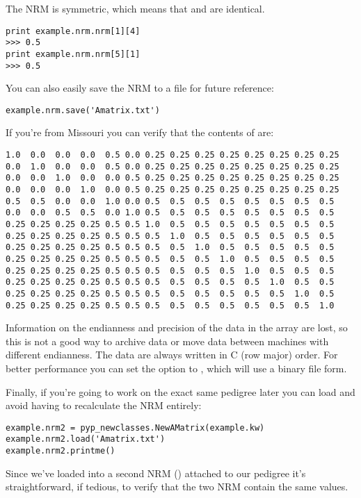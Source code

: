 The NRM is symmetric, which means that  and  are identical.
\begin{verbatim}
print example.nrm.nrm[1][4]
>>> 0.5
print example.nrm.nrm[5][1]
>>> 0.5
\end{verbatim}
You can also easily save the NRM to a file for future reference:
\begin{verbatim}
example.nrm.save('Amatrix.txt')
\end{verbatim}
If you're from Missouri you can verify that the contents of  are:
\begin{verbatim}
1.0  0.0  0.0  0.0  0.5 0.0 0.25 0.25 0.25 0.25 0.25 0.25 0.25 0.25
0.0  1.0  0.0  0.0  0.5 0.0 0.25 0.25 0.25 0.25 0.25 0.25 0.25 0.25
0.0  0.0  1.0  0.0  0.0 0.5 0.25 0.25 0.25 0.25 0.25 0.25 0.25 0.25
0.0  0.0  0.0  1.0  0.0 0.5 0.25 0.25 0.25 0.25 0.25 0.25 0.25 0.25
0.5  0.5  0.0  0.0  1.0 0.0 0.5  0.5  0.5  0.5  0.5  0.5  0.5  0.5
0.0  0.0  0.5  0.5  0.0 1.0 0.5  0.5  0.5  0.5  0.5  0.5  0.5  0.5
0.25 0.25 0.25 0.25 0.5 0.5 1.0  0.5  0.5  0.5  0.5  0.5  0.5  0.5
0.25 0.25 0.25 0.25 0.5 0.5 0.5  1.0  0.5  0.5  0.5  0.5  0.5  0.5
0.25 0.25 0.25 0.25 0.5 0.5 0.5  0.5  1.0  0.5  0.5  0.5  0.5  0.5
0.25 0.25 0.25 0.25 0.5 0.5 0.5  0.5  0.5  1.0  0.5  0.5  0.5  0.5
0.25 0.25 0.25 0.25 0.5 0.5 0.5  0.5  0.5  0.5  1.0  0.5  0.5  0.5
0.25 0.25 0.25 0.25 0.5 0.5 0.5  0.5  0.5  0.5  0.5  1.0  0.5  0.5
0.25 0.25 0.25 0.25 0.5 0.5 0.5  0.5  0.5  0.5  0.5  0.5  1.0  0.5
0.25 0.25 0.25 0.25 0.5 0.5 0.5  0.5  0.5  0.5  0.5  0.5  0.5  1.0
\end{verbatim}
Information on the endianness and precision of the data in the array are lost, so this is not a good way to archive data or move data between machines with different endianness. The data are always written in C (row major) order. For better performance you can set the  option to , which will use a binary file form.

Finally, if you're going to work on the exact same pedigree later you can load  and avoid having to recalculate the NRM entirely:
\begin{verbatim}
example.nrm2 = pyp_newclasses.NewAMatrix(example.kw)
example.nrm2.load('Amatrix.txt')
example.nrm2.printme()
\end{verbatim}
Since we've loaded  into a second NRM () attached to our pedigree it's straightforward, if tedious, to verify that the two NRM contain the same values.

